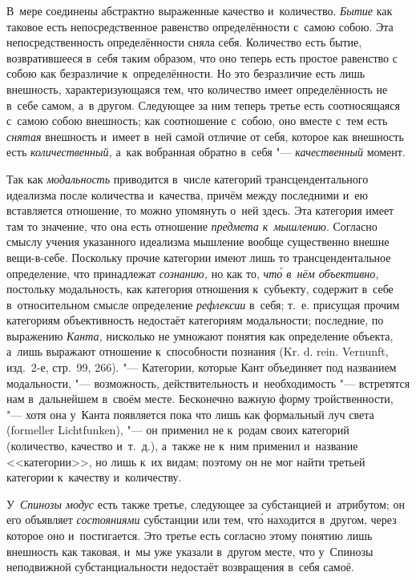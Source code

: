В~мере соединены абстрактно выраженные качество и~количество. {\em Бытие} как
таковое есть непосредственное равенство определённости с~самою собою. Эта
непосредственность определённости сняла себя. Количество есть бытие,
возвратившееся в~себя таким образом, что оно теперь есть простое равенство
с собою как безразличие к~определённости. Но это безразличие есть лишь
внешность, характеризующаяся тем, что количество имеет определённость не в~себе
самом, а~в другом. Следующее за ним теперь третье есть соотносящаяся с~самою
собою внешность; как соотношение с~собою, оно вместе с~тем есть {\em снятая}
внешность и~имеет в~ней самой отличие от себя, которое как внешность есть
{\em количественный,} а~как вобранная обратно в~себя "--- {\em качественный}
момент.

Так как {\em модальность} приводится в~числе категорий трансцендентального
идеализма после количества и~качества, причём между последними и~ею вставляется
отношение, то можно упомянуть о~ней здесь. Эта категория имеет там то значение,
что она есть отношение {\em предмета к~мышлению}. Согласно смыслу учения
указанного идеализма мышление вообще существенно внешне вещи-в-себе. Поскольку
прочие категории имеют лишь то трансцендентальное определение, что принадлежат
{\em сознанию,} но как то, {\em чт\'{о} в~нём объективно,} постольку
модальность, как категория отношения к~субъекту, содержит в~себе
в~относительном смысле определение {\em рефлексии} в~себя; т.~е. присущая
прочим категориям объективность недостаёт категориям модальности; последние, по
выражению {\em Канта,} нисколько не умножают понятия как определение объекта,
а~лишь выражают отношение к~способности познания (Kr. d. rein. Vernunft,
изд.~2-е, стр.~99, 266). "--- Категории, которые Кант объединяет под названием
модальности, "--- возможность, действительность и~необходимость "--- встретятся
нам в~дальнейшем в~своём месте. Бесконечно важную форму тройственности, "---
хотя она у~Канта появляется пока что лишь как формальный луч света (formeller
Lichtfunken), "--- он применил не к~родам своих категорий (количество, качество
и~т.~д.), а~также не к~ним применил и~название <<категории>>, но лишь к~их
видам; поэтому он не мог найти третьей категории к~качеству и~количеству.

У~{\em Спинозы модус} есть также третье, следующее за субстанцией и~атрибутом;
он его объявляет {\em состояниями} субстанции или тем, чт\'{о} находится
в~другом, через которое оно и~постигается. Это третье есть согласно этому
понятию лишь внешность как таковая, и~мы уже указали в~другом месте, что
у~Спинозы неподвижной субстанциальности недостаёт возвращения в~себя самоё.


